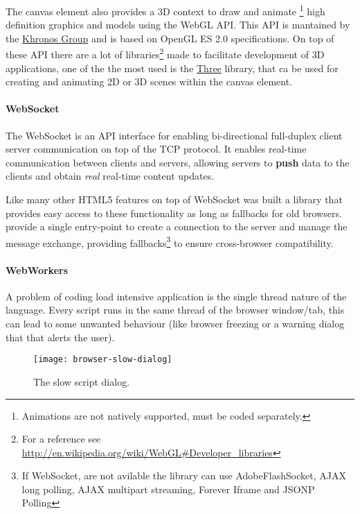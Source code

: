 The canvas element also provides a 3D context to draw and animate
\footnote{Animations are not natively supported, must be coded separately.}
high definition graphics and models using the WebGL API. This API is mantained
by the \href{http://www.khronos.org/}{Khronos Group} and is based on OpenGL ES
2.0 specifications. On top of these API there are a lot of libraries\footnote{For
a reference see \url{http://en.wikipedia.org/wiki/WebGL\#Developer_libraries}}
made to facilitate development of 3D applications, one of the the most used is
the \href{http://mrdoob.github.com/three.js/}{Three} \js{} library, that ca be
used for creating and animating 2D or 3D scenes within the canvas element.








\paragraph{WebSocket}
The WebSocket is an API interface for enabling bi-directional full-duplex client
server communication on top of the \ac{TCP} protocol. It enables real-time
communication between clients and servers, allowing servers to \textbf{push} data
to the clients and obtain \emph{real} real-time content updates.

Like many other \ac{HTML}5 features on top of WebSocket was built a library that
provides easy access to these functionality as long as fallbacks for old browsers.
 provide a single entry-point to create a connection to the
server and manage the message exchange, providing fallbacks\footnote{If WebSocket,
are not avilable the library can use Adobe\reg Flash\reg Socket, AJAX long
polling, AJAX multipart streaming, Forever Iframe and JSONP Polling} to ensure
cross-browser compatibility.





\paragraph{WebWorkers}
A problem of coding load intensive \js{} application is the single thread nature
of the language. Every script runs in the same thread of the browser window/tab,
this can lead to some unwanted behaviour (like browser freezing or a warning
dialog that that alerts the user).

\begin{figure}[htb]
    \centering
    \texttt{[image: browser-slow-dialog]}
    \caption{The slow script dialog.}
    \label{fig:browser-slow-dialog}
\end{figure}

